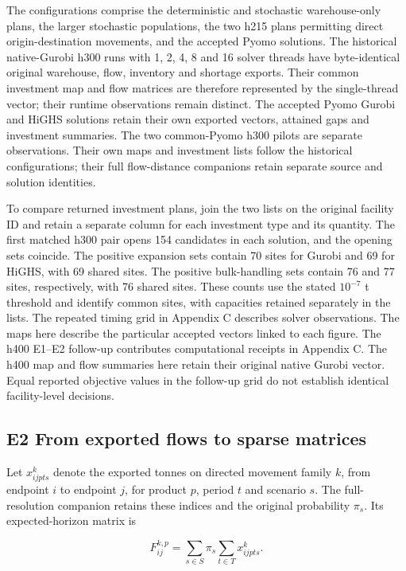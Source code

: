 \documentclass[
  english,
  11pt,
  a4paper,
]{article}
\begin{document}
The configurations comprise the deterministic and stochastic
warehouse-only plans, the larger stochastic populations, the two h215
plans permitting direct origin-destination movements, and the accepted
Pyomo solutions. The historical native-Gurobi h300 runs with 1, 2, 4, 8
and 16 solver threads have byte-identical original warehouse, flow,
inventory and shortage exports. Their common investment map and flow
matrices are therefore represented by the single-thread vector; their
runtime observations remain distinct. The accepted Pyomo Gurobi and
HiGHS solutions retain their own exported vectors, attained gaps and
investment summaries. The two common-Pyomo h300 pilots are separate
observations. Their own maps and investment lists follow the historical
configurations; their full flow-distance companions retain separate
source and solution identities.

To compare returned investment plans, join the two lists on the original
facility ID and retain a separate column for each investment type and
its quantity. The first matched h300 pair opens 154 candidates in each
solution, and the opening sets coincide. The positive expansion sets
contain 70 sites for Gurobi and 69 for HiGHS, with 69 shared sites. The
positive bulk-handling sets contain 76 and 77 sites, respectively, with
76 shared sites. These counts use the stated \(10^{-7}\) t threshold and
identify common sites, with capacities retained separately in the lists.
The repeated timing grid in Appendix C describes solver observations.
The maps here describe the particular accepted vectors linked to each
figure. The h400 E1--E2 follow-up contributes computational receipts in
Appendix C. The h400 map and flow summaries here retain their original
native Gurobi vector. Equal reported objective values in the follow-up
grid do not establish identical facility-level decisions.

\subsection{E2 From exported flows to sparse
matrices}\label{e2-from-exported-flows-to-sparse-matrices}

Let \(x^{k}_{ijpts}\) denote the exported tonnes on directed movement
family \(k\), from endpoint \(i\) to endpoint \(j\), for product \(p\),
period \(t\) and scenario \(s\). The full-resolution companion retains
these indices and the original probability \(\pi_s\). Its
expected-horizon matrix is

\[
F^{k,p}_{ij}=\sum_{s\in S}\pi_s\sum_{t\in T}x^{k}_{ijpts}.
\]
\end{document}

